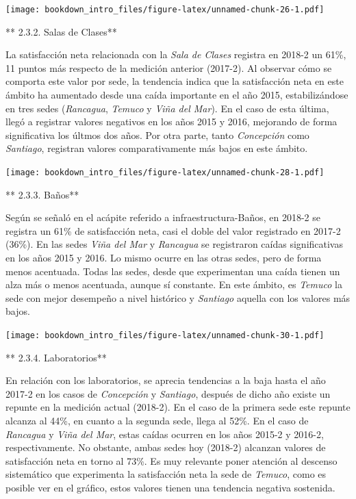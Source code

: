 \documentclass[]{book}
\begin{document}
\texttt{[image: bookdown\_intro\_files/figure-latex/unnamed-chunk-26-1.pdf]}

** 2.3.2. Salas de Clases**

La satisfacción neta relacionada con la \emph{Sala de Clases} registra
en 2018-2 un 61\%, 11 puntos más respecto de la medición anterior
(2017-2). Al observar cómo se comporta este valor por sede, la tendencia
indica que la satisfacción neta en este ámbito ha aumentado desde una
caída importante en el año 2015, estabilizándose en tres sedes
(\emph{Rancagua}, \emph{Temuco} y \emph{Viña del Mar}). En el caso de
esta última, llegó a registrar valores negativos en los años 2015 y
2016, mejorando de forma significativa los últmos dos años. Por otra
parte, tanto \emph{Concepción} como \emph{Santiago}, registran valores
comparativamente más bajos en este ámbito.

\texttt{[image: bookdown\_intro\_files/figure-latex/unnamed-chunk-28-1.pdf]}

** 2.3.3. Baños**

Según se señaló en el acápite referido a infraestructura-Baños, en
2018-2 se registra un 61\% de satisfacción neta, casi el doble del valor
registrado en 2017-2 (36\%). En las sedes \emph{Viña del Mar} y
\emph{Rancagua} se registraron caídas significativas en los años 2015 y
2016. Lo mismo ocurre en las otras sedes, pero de forma menos acentuada.
Todas las sedes, desde que experimentan una caída tienen un alza más o
menos acentuada, aunque sí constante. En este ámbito, es \emph{Temuco}
la sede con mejor desempeño a nivel histórico y \emph{Santiago} aquella
con los valores más bajos.

\texttt{[image: bookdown\_intro\_files/figure-latex/unnamed-chunk-30-1.pdf]}

** 2.3.4. Laboratorios**

En relación con los laboratorios, se aprecia tendencias a la baja hasta
el año 2017-2 en los casos de \emph{Concepción} y \emph{Santiago},
después de dicho año existe un repunte en la medición actual (2018-2).
En el caso de la primera sede este repunte alcanza al 44\%, en cuanto a
la segunda sede, llega al 52\%. En el caso de \emph{Rancagua} y
\emph{Viña del Mar}, estas caídas ocurren en los años 2015-2 y 2016-2,
respectivamente. No obstante, ambas sedes hoy (2018-2) alcanzan valores
de satisfacción neta en torno al 73\%. Es muy relevante poner atención
al descenso sistemático que experimenta la satisfacción neta la sede de
\emph{Temuco}, como es posible ver en el gráfico, estos valores tienen
una tendencia negativa sostenida.
\end{document}
